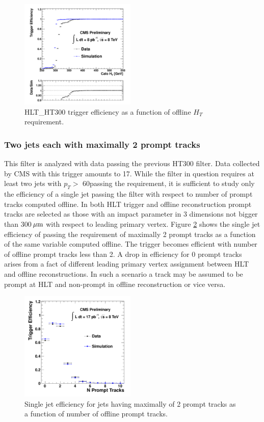\begin{figure}[htbp]
\centering
 \includegraphics[width=0.49\textwidth]{plots/trigger/effHT300.pdf}
\caption{HLT\_HT300 trigger efficiency as a function of offline $H_T$ requirement. \label{fig:effHT300}}
\end{figure} 

\subsubsection{Two jets each with maximally 2 prompt tracks}
\label{subsubsec:trig2Trks}

This filter is analyzed with data passing the previous 
HT300 filter. Data collected by CMS with this trigger amounts to 17\pbinv.  While the filter in question
 requires at least two jets with $p_T>$ 60\GeVc passing the requirement, it is sufficient to study
 only the efficiency
 of a single jet passing the filter with respect to number of prompt tracks computed offline.
 In both HLT trigger and offline
 reconstruction prompt tracks are selected as those with an impact parameter in 3 dimensions 
not bigger than 300$\,\mu\text{m}$
 with respect to leading primary vertex. Figure \ref{fig:eff2Trks} shows the single jet efficiency of passing
 the requirement of maximally 2 prompt tracks as a function of the same variable computed offline.
 The trigger becomes efficient with number of offline prompt tracks less than 2. 
A drop in efficiency for 0 prompt tracks arises from a fact of different leading primary vertex assignment 
between HLT and offline reconstructions. 
In such a scenario a track may be assumed to be prompt at HLT and non-prompt
 in offline reconstruction or vice versa. 
  

\begin{figure}[htbp]
\centering
 \includegraphics[width=0.49\textwidth]{plots/trigger/effHT300_2Trk_NPromptTracks.pdf}
\caption{Single jet efficiency for jets having maximally of 2 prompt tracks as a function of number of offline prompt tracks. \label{fig:eff2Trks}}
\end{figure}


